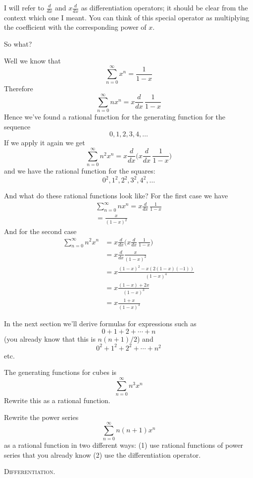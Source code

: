 I will refer to $\frac{d}{dx}$ and $x\frac{d}{dx}$ as differentiation
operators; it should be clear from the context which one I meant.
You can think of this special operator as multiplying the
coefficient with the corresponding power of $x$.

So what?

Well we know that
\[
\sum_{n=0}^\infty x^n = \frac{1}{1-x}
\]
Therefore
\[
\sum_{n=0}^\infty nx^n = x\frac{d}{dx} \, \frac{1}{1-x}
\]
Hence we've found a rational function for the generating function for
the sequence
\[
0, 1, 2, 3, 4, \ldots
\]
If we apply it again we get
\[
\sum_{n=0}^\infty n^2x^n = 
x\frac{d}{dx} 
\biggl( 
x\frac{d}{dx} \, \frac{1}{1-x}
\biggl)
\]
and we have the rational function for the squares:
\[
0^2, 1^2, 2^2, 3^2, 4^2, \ldots
\]

And what do these rational functions look like?
For the first case we have
\begin{align*}
\sum_{n=0}^\infty nx^n 
= x\frac{d}{dx} \, \frac{1}{1-x} \\
= \frac{x}{(1 - x)^2}
\end{align*}
And for the second case
\begin{align*}
\sum_{n=0}^\infty n^2x^n 
&= x\frac{d}{dx} \biggl( x \frac{d}{dx} \, \frac{1}{1-x} \biggr) \\
&= x\frac{d}{dx} \frac{x}{(1 - x)^2} \\
&= x \frac{(1-x)^2 - x(2(1-x)(-1))}{(1-x)^4} \\
&= x \frac{(1-x) + 2x}{(1-x)^3} \\
&= x \frac{1 + x}{(1-x)^3}
\end{align*}

In the next section we'll derive formulas for expressions such as
\[
0 + 1 + 2 + \cdots + n
\]
(you already know that this is $n(n+1)/2$) and
\[
0^2 + 1^2 + 2^2 + \cdots + n^2
\]
etc.


\newpage
\begin{ex}
The generating functions for cubes is
\[
\sum_{n=0}^\infty n^3 x^n
\]
Rewrite this as a rational function.
\end{ex}


\newpage
\begin{ex}
Rewrite the power series
\[
\sum_{n=0}^\infty n(n+1) x^n
\]
as a rational function in two different ways:
(1) use rational functions of power series that you already know
(2) use the differentiation operator.
\end{ex}


\newpage
\textsc{Differentiation.}

